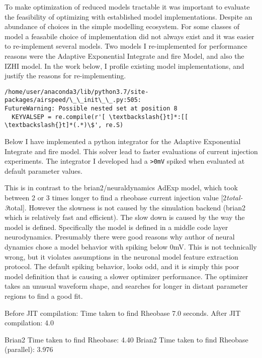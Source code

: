     
    

    
    To make optimization of reduced models tractable it was important to
evaluate the feasibility of optimizing with established model
implementations. Despite an abundance of choices in the simple modelling
ecosystem. For some classes of model a feasabile choice of
implementation did not always exist and it was easier to re-implement
several models. Two models I re-implemented for performance reasons were
the Adaptive Exponential Integrate and fire Model, and also the IZHI
model. In the work below, I profile existing model implementations, and
justify the reasons for re-implementing.

    \begin{Verbatim}[commandchars=\\\{\}]
/home/user/anaconda3/lib/python3.7/site-packages/airspeed/\_\_init\_\_.py:505:
FutureWarning: Possible nested set at position 8
  KEYVALSEP = re.compile(r'[ \textbackslash{}t]*:[[ \textbackslash{}t]*(.*)\$', re.S)
    \end{Verbatim}

    Below I have implemented a python integrator for the Adaptive
Exponential Integrate and fire model. This solver lead to faster
evaluations of current injection experiments. The integrator I developed
had a \texttt{\textgreater{}0mV} spiked when evaluated at default
parameter values.

This is in contrast to the brian2/neuraldynamics AdExp model, which took
between 2 or 3 times longer to find a rheobase current injection value
{[}2\emph{total-3}total{]}. However the slowness is not caused by the
simulation backend (brian2 which is relatively fast and efficient). The
slow down is caused by the way the model is defined. Specifically the
model is defined in a middle code layer neurodynamics. Presumably there
were good reasons why author of neural dynamics chose a model behavior
with spiking below 0mV. This is not technically wrong, but it violates
assumptions in the neuronal model feature extraction protocol. The
default spiking behavior, looks odd, and it is simply this poor model
definition that is causing a slower optimizer performance. The optimizer
takes an unusual waveform shape, and searches for longer in distant
parameter regions to find a good fit.

Before JIT compilation: Time taken to find Rheobase 7.0 seconds. After
JIT compilation: 4.0

Brian2 Time taken to find Rheobase: 4.40 Brian2 Time taken to find
Rheobase (parallel): 3.976

